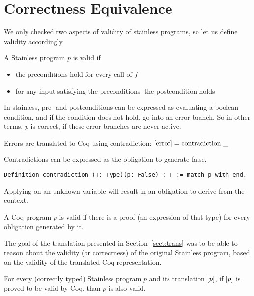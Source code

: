 \section{Correctness Equivalence}
We only checked two aspects of validity of stainless programs, so let us define validity accordingly
\begin{definition}
	A Stainless program $p$ is valid if
	
	\begin{itemize}
		\item the preconditions hold for every call of $f$
		\item for any input satisfying the preconditions, the postcondition holds
	\end{itemize}

In stainless, pre- and postconditions can be expressed as evaluating a boolean condition, and if the condition does not hold, go into an error branch. So in other terms, $p$ is correct, if these error branches are never active.
\end{definition}

Errors are translated to Coq using contradiction: $[\text{error}] = \text{contradiction} ~ \_$

Contradictions can be expressed as the obligation to generate false.

\begin{lstlisting}[style=myCoqstyle]
Definition contradiction (T: Type)(p: False) : T := match p with end.
\end{lstlisting} 

Applying  on an unknown variable will result in an obligation to derive  from the context.

\begin{definition}
	A Coq program $p$ is valid if there is a proof (an expression of that type) for every obligation generated by it.
\end{definition}

The goal of the translation presented in Section~\ref{sect:trans} was to be able to reason about the validity (or correctness) of the original Stainless program, based on the validity of the translated Coq representation.

\begin{theorem}
	For every (correctly typed) Stainless program $p$ and its translation $[p]$, if $[p]$ is proved to be valid by Coq, than $p$ is also valid.
\end{theorem}


